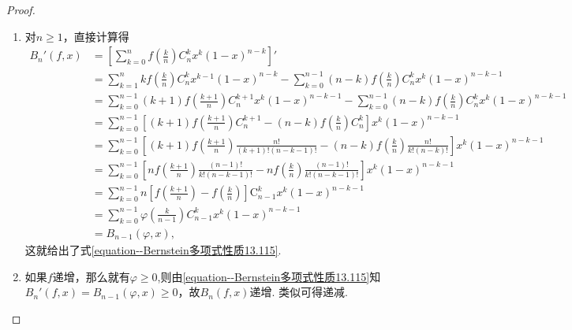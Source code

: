 \documentclass[../../main.tex]{subfiles}
\begin{document}
\begin{proof}
\begin{enumerate}[(1)]
\item 对\(n\geqslant1\)，直接计算得
\begin{align*}
B_n'(f,x)&=\left[\sum_{k = 0}^n f\left(\frac{k}{n}\right)C_n^k x^k(1 - x)^{n - k}\right]'\\
&=\sum_{k = 1}^n kf\left(\frac{k}{n}\right)C_n^k x^{k - 1}(1 - x)^{n - k}-\sum_{k = 0}^{n - 1}(n - k)f\left(\frac{k}{n}\right)C_n^k x^k(1 - x)^{n - k - 1}\\
&=\sum_{k = 0}^{n - 1}(k + 1)f\left(\frac{k + 1}{n}\right)C_n^{k + 1}x^k(1 - x)^{n - k - 1}-\sum_{k = 0}^{n - 1}(n - k)f\left(\frac{k}{n}\right)C_n^k x^k(1 - x)^{n - k - 1}\\
&=\sum_{k=0}^{n-1}{\left[ \left( k+1 \right) f\left( \frac{k+1}{n} \right) C_{n}^{k+1}-\left( n-k \right) f\left( \frac{k}{n} \right) C_{n}^{k} \right] x^k\left( 1-x \right) ^{n-k-1}}
\\
&=\sum_{k=0}^{n-1}{\left[ \left( k+1 \right) f\left( \frac{k+1}{n} \right) \frac{n!}{\left( k+1 \right) !\left( n-k-1 \right) !}-\left( n-k \right) f\left( \frac{k}{n} \right) \frac{n!}{k!\left( n-k \right) !} \right] x^k\left( 1-x \right) ^{n-k-1}}
\\
&=\sum_{k=0}^{n-1}{\left[ nf\left( \frac{k+1}{n} \right) \frac{\left( n-1 \right) !}{k!\left( n-k-1 \right) !}-nf\left( \frac{k}{n} \right) \frac{\left( n-1 \right) !}{k!\left( n-k-1 \right) !} \right] x^k\left( 1-x \right) ^{n-k-1}}
\\
&=\sum_{k=0}^{n-1}{n\left[ f\left( \frac{k+1}{n} \right) -f\left( \frac{k}{n} \right) \right] \mathrm{C}_{n-1}^{k}x^k\left( 1-x \right) ^{n-k-1}}
\\
&=\sum_{k = 0}^{n - 1}\varphi\left(\frac{k}{n - 1}\right)C_{n - 1}^k x^k(1 - x)^{n - k - 1}\\
&=B_{n - 1}(\varphi,x),
\end{align*}
这就给出了式\eqref{equation--Bernstein多项式性质13.115}. 

\item 如果\(f\)递增，那么就有$\varphi\geqslant 0$,则由\eqref{equation--Bernstein多项式性质13.115}知\(B_n'(f,x)=B_{n - 1}(\varphi,x)\geqslant0\)，故\(B_n(f,x)\)递增. 类似可得递减.


\end{enumerate}
\end{proof}
\end{document}
